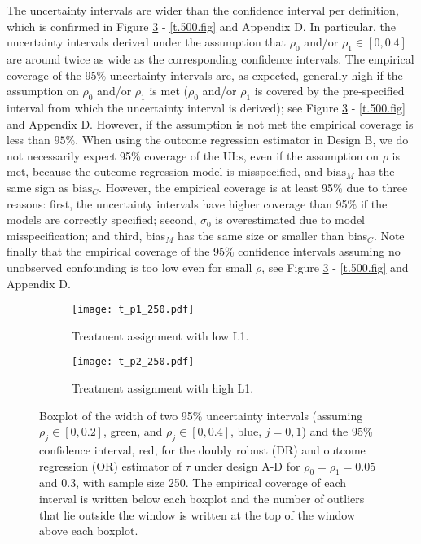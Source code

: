 \documentclass[11pt]{article}
\newcommand{\bias}{\mbox{bias}}
\begin{document}
The uncertainty intervals are wider than the confidence interval per definition, which is confirmed in Figure \ref{t.250.fig} - \ref{t.500.fig} and Appendix D. In particular, the uncertainty intervals derived under the assumption that $\rho_0$ and/or $\rho_1 \in [0,0.4]$ are around twice as wide as the corresponding confidence intervals. The empirical coverage of the 95$\%$ uncertainty intervals are, as expected, generally high if the assumption on $\rho_0$ and/or $\rho_1$ is met ($\rho_0$ and/or $\rho_1$ is covered by the pre-specified interval from which the uncertainty interval is derived); see Figure \ref{t.250.fig} - \ref{t.500.fig} and Appendix D. However, if the assumption is not met the empirical coverage is less than $95 \%$. When using the outcome regression estimator in Design B, we do not necessarily expect 95$\%$ coverage of the UI:s, even if the assumption on $\rho$ is met, because the outcome regression model is misspecified, and $\bias_M$ has the same sign as $\bias_C$. However, the empirical coverage is at least 95$\%$ due to three reasons: first, the uncertainty intervals have higher coverage than 95$\%$ if the models are correctly specified; second, $\sigma_0$ is overestimated due to model misspecification; and third, bias$_M$ has the same size or smaller than bias$_C$. Note finally that the empirical coverage of the 95$\%$ confidence intervals assuming no unobserved confounding is too low even for small $\rho$, see Figure \ref{t.250.fig} - \ref{t.500.fig} and Appendix D.

\begin{figure} [htbp]
\centering
\begin{subfigure}[b]{\textwidth}
\texttt{[image: t\_p1\_250.pdf]}
\caption{Treatment assignment with low L1.}
\label{t.p1.250.fig}
\end{subfigure}
\begin{subfigure}[b]{\textwidth}
\texttt{[image: t\_p2\_250.pdf]}
\caption{Treatment assignment with high L1.}
\label{t.p2.250.fig}
\end{subfigure}
\caption{Boxplot of the width of two 95\% uncertainty intervals (assuming $\rho_j \in [0,0.2]$, green, and $\rho_j \in [0,0.4]$, blue, $j=0,1$) and the 95\% confidence interval, red, for the doubly robust (DR) and outcome regression (OR) estimator of $\tau$ under design A-D for $\rho_0=\rho_1=0.05$ and $0.3$, with sample size 250. The empirical coverage of each interval is written below each boxplot and the number of outliers that lie outside the window is written at the top of the window above each boxplot.}
\label{t.250.fig}
\end{figure}
\end{document}
